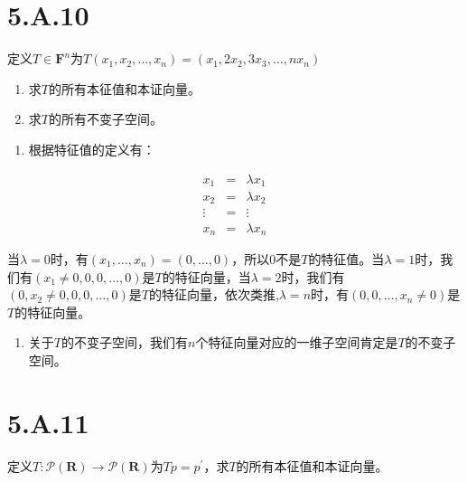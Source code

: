 \documentclass[10pt,a4paper,UTF8]{article}
\begin{document}
\section{5.A.10}
\label{sec:org29b6da2}


\begin{problem}
定义\(T\in \mathbf{F}^{n}\)为\(T(x_{1},x_{2},\ldots ,x_{n}) = (x_{1},2x_{2},3x_{3},\ldots ,nx_{n})\)
\begin{enumerate}
\item 求\(T\)的所有本征值和本证向量。
\item 求\(T\)的所有不变子空间。
\end{enumerate}
\end{problem}

\begin{answer}
\begin{enumerate}
\item 根据特征值的定义有：
\end{enumerate}
\begin{eqnarray}
\label{eq:7}
x_{1}&=&\lambda x_{1} \\
x_{2}&=&\lambda x_{2} \\
\vdots &=& \vdots \\
x_{n} &=&\lambda x_{n}
\end{eqnarray}

当\(\lambda = 0\)时，有\((x_{1},\ldots ,x_{n}) = (0,\ldots ,0)\)，所以\(0\)不是\(T\)的特征值。当\(\lambda = 1\)时，我们有\((x_{1}\neq 0, 0,0,\ldots ,0)\)是\(T\)的特征向量，当\(\lambda = 2\)时，我们有\((0,x_{2}\neq 0, 0,0,\ldots ,0)\)是\(T\)的特征向量，依次类推,\(\lambda = n\)时，有\((0,0,\ldots ,x_{n}\neq 0)\)是\(T\)的特征向量。

\begin{enumerate}
\item 关于\(T\)的不变子空间，我们有\(n\)个特征向量对应的一维子空间肯定是\(T\)的不变子空间。
\end{enumerate}
\end{answer}
\section{5.A.11}
\label{sec:orgb58965b}


\begin{problem}
定义\(T: \mathcal{P}(\mathbf{R}) \rightarrow \mathcal{P}(\mathbf{R})\)为\(Tp = p^{'}\)，求\(T\)的所有本征值和本证向量。
\end{problem}
\end{document}
